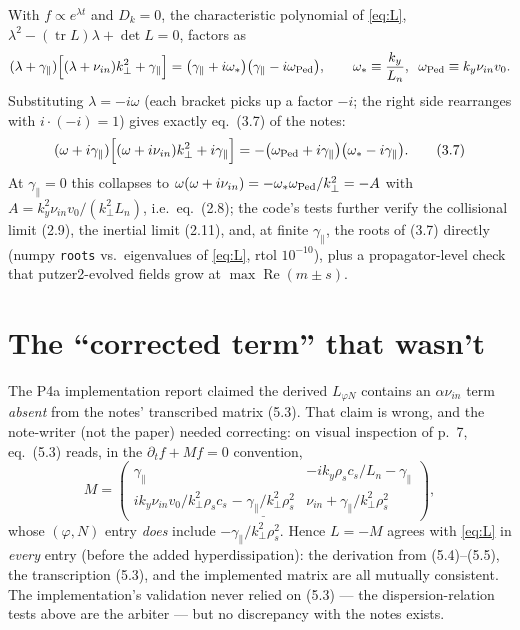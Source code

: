\documentclass[11pt]{article}
\newcommand{\kp}{k_\perp}
\newcommand{\gpar}{\gamma_\parallel}
\newcommand{\nuin}{\nu_{in}}
\begin{document}
With $f\propto e^{\lambda t}$ and $D_k=0$, the characteristic polynomial of \eqref{eq:L},
$\lambda^2 - (\operatorname{tr}L)\lambda + \det L = 0$, factors as
\begin{equation}
(\lambda + \gpar)\Big[(\lambda + \nuin)\kp^2 + \gpar\Big]
 = \big(\gpar + i\omega_*\big)\big(\gpar - i\omega_{\rm Ped}\big),
\qquad
\omega_* \equiv \frac{k_y}{L_n},\;\;
\omega_{\rm Ped} \equiv k_y \nuin v_0 .
\end{equation}
Substituting $\lambda = -i\omega$ (each bracket picks up a factor $-i$; the right side
rearranges with $i\cdot(-i)=1$) gives exactly eq.~(3.7) of the notes:
\begin{equation}
(\omega + i\gpar)\Big[(\omega + i\nuin)\kp^2 + i\gpar\Big]
 = -\big(\omega_{\rm Ped} + i\gpar\big)\big(\omega_* - i\gpar\big).
\tag{3.7}
\end{equation}
At $\gpar=0$ this collapses to $\omega(\omega+i\nuin) = -\omega_*\omega_{\rm Ped}/\kp^2
= -A$ with $A = k_y^2\nuin v_0/(\kp^2 L_n)$, i.e.\ eq.~(2.8); the code's tests further
verify the collisional limit (2.9), the inertial limit (2.11), and, at finite $\gpar$,
the roots of (3.7) directly (numpy \texttt{roots} vs.\ eigenvalues of \eqref{eq:L},
rtol $10^{-10}$), plus a propagator-level check that putzer2-evolved fields grow at
$\max\operatorname{Re}(m\pm s)$.

\section{The ``corrected term'' that wasn't}

The P4a implementation report claimed the derived $L_{\varphi N}$ contains an
$\alpha\nuin$ term \emph{absent} from the notes' transcribed matrix (5.3). That claim is
wrong, and the note-writer (not the paper) needed correcting: on visual inspection of
p.~7, eq.~(5.3) reads, in the $\partial_t f + M f = 0$ convention,
\begin{equation}
M = \begin{pmatrix}
\gpar & -i k_y \rho_s c_s/L_n - \gpar\\[0.5ex]
i k_y \nuin v_0 / \kp^2\rho_s c_s \;\underline{-\;\gpar/\kp^2\rho_s^2} &
\nuin + \gpar/\kp^2\rho_s^2
\end{pmatrix},
\tag{5.3}
\end{equation}
whose $(\varphi,N)$ entry \emph{does} include $-\gpar/\kp^2\rho_s^2$. Hence
$L = -M$ agrees with \eqref{eq:L} in \emph{every} entry (before the added
hyperdissipation): the derivation from (5.4)--(5.5), the transcription (5.3), and the
implemented matrix are all mutually consistent. The implementation's validation never
relied on (5.3) --- the dispersion-relation tests above are the arbiter --- but no
discrepancy with the notes exists.
\end{document}
